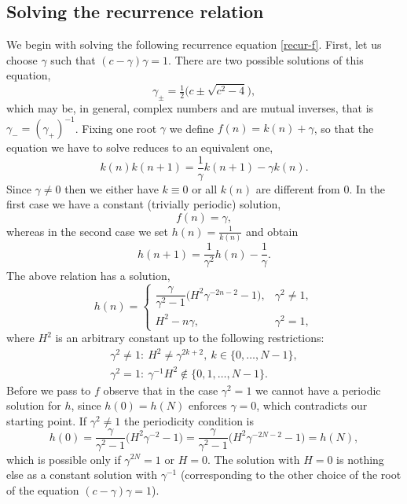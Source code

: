 \documentclass[pdftex]{sigma}
\numberwithin{equation}{section}
\begin{document}
\subsection{Solving the recurrence relation}
We begin with solving the following recurrence equation \eqref{recur-f}. First, let us choose $\gamma$ such that
$(c-\gamma)\gamma=1$. There are two possible solutions of this equation,
\[ \gamma_\pm = \tfrac{1}{2} \big(c \pm \sqrt{c^2-4}\big),\]
which may be, in general, complex numbers and are mutual inverses, that is $\gamma_- = (\gamma_+)^{-1}$.
Fixing one root $\gamma$ we define $f(n)=k(n)+\gamma$, so that the equation we have to solve reduces to
an equivalent one,
\begin{equation*}
k(n)k(n+1)=\frac{1}{\gamma}k(n+1)-\gamma k(n).
\end{equation*}
Since $\gamma\not=0$ then we either have $k\equiv 0$ or all $k(n)$ are different from $0$.
In the first case we have a constant (trivially periodic) solution,
\[ f(n) = \gamma, \]
whereas in the second case we set $h(n)=\frac{1}{k(n)}$ and obtain
\begin{equation*}
h(n+1)=\frac{1}{\gamma^2}h(n)-\frac{1}{\gamma}.
\end{equation*}
The above relation has a solution,
\begin{equation*}
h(n) =
\begin{cases}
\dfrac{\gamma}{\gamma^2-1 } \bigl( H^2 \gamma^{-2n-2} - 1 \bigr) , & \gamma^2 \not=1, \\
H^2 - n \gamma, & \gamma^2 = 1,
\end{cases}
\end{equation*}
where $H^2$ is an arbitrary constant up to the following restrictions:
\begin{gather*}
 \gamma^2 \not=1\colon \ H^2\neq \gamma^{2k+2}, \ k \in \{0,\ldots, N-1\}, \\
 \gamma^2 = 1\colon \ \gamma^{-1} H^2 \notin \{0,1,\ldots,N-1\}.
\end{gather*}
Before we pass to $f$ observe that in the case $\gamma^2=1$ we cannot have a periodic solution for $h$,
since $h(0)=h(N)$ enforces $\gamma=0$, which contradicts our starting point.
If $\gamma^2\not=1$ the periodicity condition is
\[ h(0) = \frac{\gamma}{\gamma^2-1 } \bigl( H^2 \gamma^{-2} - 1 \bigr) = \frac{\gamma}{\gamma^2-1 } \bigl( H^2 \gamma^{-2N-2} - 1 \bigr) = h(N), \]
which is possible only if $\gamma^{2N}=1$ or $H=0$. The solution with $H=0$ is nothing else as a constant solution with
$\gamma^{-1}$ (corresponding to the other choice of the root of the equation $(c-\gamma)\gamma=1$).
\end{document}
